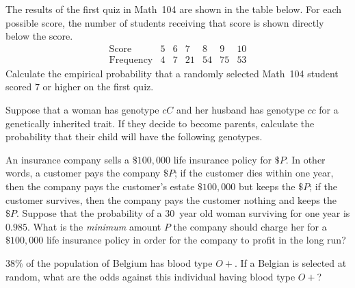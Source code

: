 \documentclass[addpoints,12pt]{exam}
\begin{document}
\begin{questions}
\question[10] The results of the first quiz in Math~104 are
shown in the table below. For each possible score, the number
of students receiving that score is shown directly below
the score.
\[\begin{array}{c|ccccccc}
\text{Score}&5&6&7&8&9&10\\\hline
\text{Frequency}&4&7&21&54&75&53
\end{array}\]
Calculate the empirical probability that a randomly
selected Math~104 student scored $7$ or higher
on the first quiz.
\vspace{2in}

\question[10]
Suppose that a woman has genotype $cC$
and her husband has genotype $cc$ for a
genetically inherited trait.
If they decide to become parents, calculate the
probability that their child will
have the following genotypes.
\newpage

\question[12] An insurance company sells a $\$100,000$
life insurance policy for $\$P$. 
In other words, a customer pays the company $\$P$;
if the customer dies within one year, then the company
pays the customer's estate $\$100,000$ but keeps the $\$P$;
if the customer survives, then
the company pays the customer nothing and keeps the $\$P$. 
Suppose that the probability of a $30$~year old woman surviving
for one year is $0.985$.
What is the {\em minimum} amount $P$ the
company should charge her for a  $\$100,000$ life
insurance policy in order
for the company to profit in the long run?
\vspace{3in}

\question[8] $38\%$ of the population of Belgium has blood type $O+$.
If a Belgian is selected at random, what are the odds
against this individual having blood type $O+$?
\vspace{1in}


\end{questions}
\end{document}
